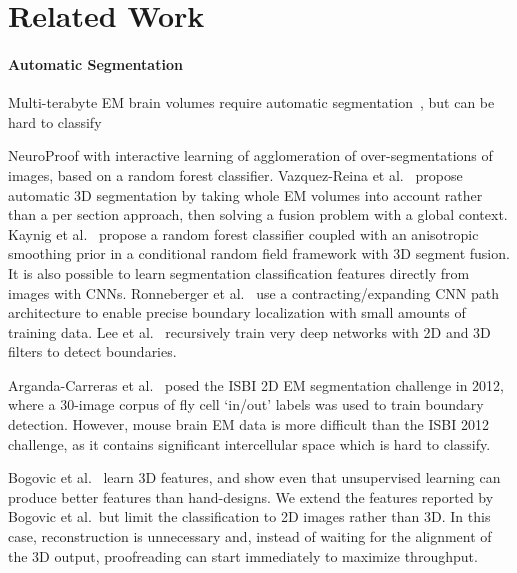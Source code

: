 \section{Related Work}

\paragraph{Automatic Segmentation}

Multi-terabyte EM brain volumes require automatic segmentation~\cite{jain2010,Liu2014,NunezIglesias2013Machine,GALA2014}, but can be hard to classify 

NeuroProof \cite{neuroproof2013}  with interactive learning of agglomeration of over-segmentations of images, based on a random forest classifier. Vazquez-Reina et al.~\cite{amelio_segmentation} propose automatic 3D segmentation by taking whole EM volumes into account rather than a per section approach, then solving a fusion problem with a global context. Kaynig et al.~\cite{kaynig10} propose a random forest classifier coupled with an anisotropic smoothing prior in a conditional random field framework with 3D segment fusion. It is also possible to learn segmentation classification features directly from images with CNNs. Ronneberger et al.~\cite{RonnebergerFB15} use a contracting/expanding CNN path architecture to enable precise boundary localization with small amounts of training data. Lee et al.~\cite{lee2015recursive} recursively train very deep networks with 2D and 3D filters to detect boundaries. 


Arganda-Carreras et al.~\cite{10.3389/fnana.2015.00142} posed the ISBI 2D EM segmentation challenge in 2012, where a 30-image corpus of fly cell `in/out' labels was used to train boundary detection. However, mouse brain EM data is more difficult than the ISBI 2012 challenge, as it contains significant intercellular space which is hard to classify.

Bogovic et al.~\cite{BogovicHJ13} learn 3D features, and show even that unsupervised learning can produce better features than hand-designs. We extend the features reported by Bogovic et al.\ but limit the classification to 2D images rather than 3D. In this case, reconstruction is unnecessary and, instead of waiting for the alignment of the 3D output, proofreading can start immediately to maximize throughput.

